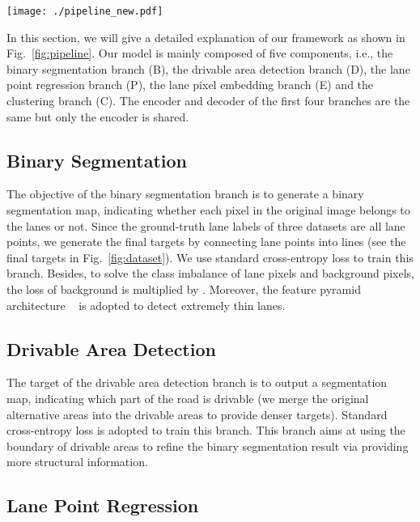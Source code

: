 \documentclass[draftcls]{IEEEtran}
\begin{document}
\begin{figure*}[t]
  \centering
  \texttt{[image: ./pipeline\_new.pdf]}
  \vskip -0.2cm
  \caption{An overview of our agnostic lane detection model.}
  \centering
  \label{fig:pipeline}
\end{figure*}



In this section, we will give a detailed explanation of our framework as shown in Fig.~\ref{fig:pipeline}. Our model is mainly composed of five components, i.e., the binary segmentation branch (B), the drivable area detection branch (D), the lane point regression branch (P), the lane pixel embedding branch (E) and the clustering branch (C). The encoder and decoder of the first four branches are the same but only the encoder is shared.    


\subsection{Binary Segmentation}

The objective of the binary segmentation branch is to generate a binary segmentation map, indicating whether each pixel in the original image belongs to the lanes or not. Since the ground-truth lane labels of three datasets are all lane points, we generate the final targets by connecting lane points into lines (see the final targets in Fig.~\ref{fig:dataset}). We use standard cross-entropy loss to train this branch. Besides, to solve the class imbalance of lane pixels and background pixels, the loss of background is multiplied by . Moreover, the feature pyramid architecture ~\cite{lin2017feature} is adopted to detect extremely thin lanes.       

\subsection{Drivable Area Detection}

The target of the drivable area detection branch is to output a segmentation map, indicating which part of the road is drivable (we merge the original alternative areas into the drivable areas to provide denser targets). Standard cross-entropy loss is adopted to train this branch. This branch aims at using the boundary of drivable areas to refine the binary segmentation result via providing more structural information.    

\subsection{Lane Point Regression}
\end{document}
